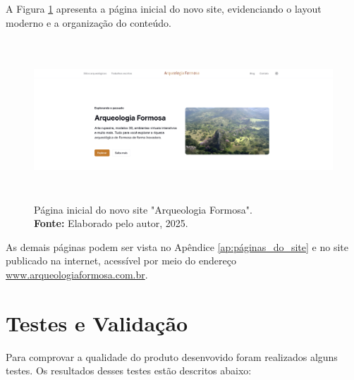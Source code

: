 A Figura \ref{fig:site_homepage} apresenta a página inicial do novo site, evidenciando o layout moderno e a organização do conteúdo.

\begin{figure}[H]
    \centering
    \includegraphics[height=6cm, keepaspectratio]{img/site/hero1.png}
    \caption{Página inicial do novo site "Arqueologia Formosa". \\
    \textbf{Fonte:} Elaborado pelo autor, 2025.}
    \label{fig:site_homepage}
\end{figure}

As demais páginas podem ser vista no Apêndice \ref{ap:páginas_do_site} e no site publicado na internet, acessível por meio do endereço \url{www.arqueologiaformosa.com.br}.

\section{Testes e Validação}
Para comprovar a qualidade do produto desenvovido foram realizados alguns testes. Os resultados desses testes estão descritos abaixo:


